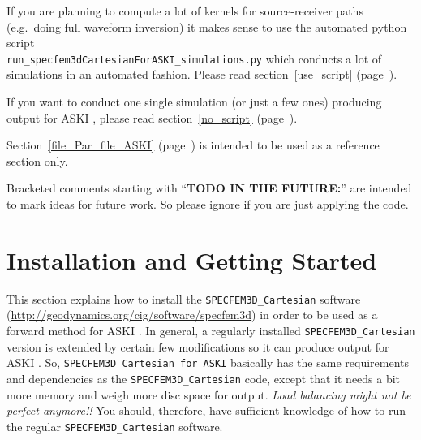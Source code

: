 \documentclass[12pt,a4paper]{article}
\newcommand{\lcode}[1]{\nolinkurl{#1}}
\newcommand{\ASKI}{ {\ttfamily ASKI} }
\newcommand{\myref}[1]{\ref{#1} (page~\pageref{#1})}
\begin{document}
If you are planning to compute a lot of kernels for source-receiver paths (e.g.\ doing full waveform inversion) 
it makes sense to use the automated python script \\ \lcode{run_specfem3dCartesianForASKI_simulations.py} 
which conducts a lot of simulations in an automated fashion. Please read section~\myref{use_script}. 

If you want to conduct one single simulation (or just a few ones) producing output for \ASKI{}, please 
read section~\myref{no_script}.

Section~\myref{file_Par_file_ASKI} is intended to be used as a reference section only.

Bracketed comments starting with ``{\bf TODO IN THE FUTURE:}'' are intended to mark ideas for future work. 
So please ignore if you are just applying the code.
%
\newpage
\tableofcontents
\newpage
%
\section{Installation and Getting Started} \label{install}
%
This section explains how to install the \lcode{SPECFEM3D_Cartesian} software 
(\url{http://geodynamics.org/cig/software/specfem3d})
in order to be used as a forward method for \ASKI{}. 
In general, a regularly installed \lcode{SPECFEM3D_Cartesian} version is extended by certain few modifications 
so it can produce output for \ASKI{}. So, \lcode{SPECFEM3D_Cartesian for ASKI} basically has the same requirements 
and dependencies as the \lcode{SPECFEM3D_Cartesian} code, except that it needs a bit more memory and weigh more 
disc space for output. \emph{Load balancing might not be perfect anymore!!} You should, therefore, have sufficient 
knowledge of how to run the regular \lcode{SPECFEM3D_Cartesian} software. 

\end{document}
